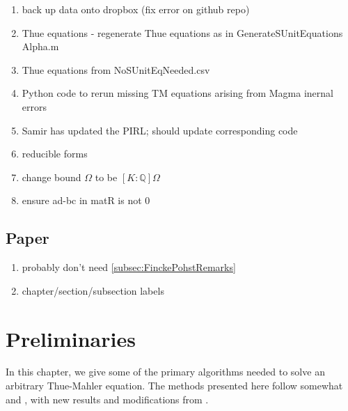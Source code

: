 \documentclass[11pt]{report}
\theoremstyle{definition}
\begin{document}
\begin{enumerate}[\hspace{0.5cm}1.]
\item back up data onto dropbox (fix error on github repo)
\item Thue equations - regenerate Thue equations as in GenerateSUnitEquations Alpha.m
\item Thue equations from NoSUnitEqNeeded.csv
\item Python code to rerun missing TM equations arising from Magma inernal errors
\item Samir has updated the PIRL; should update corresponding code
\item reducible forms
\item change bound $\Omega$ to be $[K:\mathbb{Q}]\Omega$
\item ensure ad-bc in matR is not 0
\end{enumerate}


\section{Paper}
\label{sec:paper}

\begin{enumerate}[\hspace{0.5cm}1.]
\item probably don't need \autoref{subsec:FinckePohstRemarks}
\item chapter/section/subsection labels
\end{enumerate}


\chapter{Preliminaries}
\label{cha:preliminaries}

In this chapter, we give some of the primary algorithms needed to solve an arbitrary Thue-Mahler equation. The methods presented here follow somewhat \cite{Ham} and \cite{TW3}, with new results and modifications from \cite{GhKaMaSi}.

\end{document}
